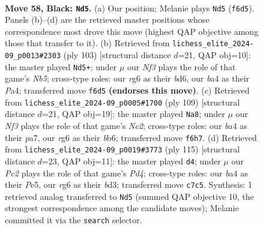 \documentclass[11pt]{article}
\begin{document}
\clearpage

\begin{figure}[p]\centering
\begin{subfigure}{0.46\textwidth}\centering
\resizebox{\linewidth}{!}{%
\newchessgame
\chessboard[
  setfen={2k5/p1p5/5nR1/5p2/B4P2/4B3/2K4P/8 b - - 0 58},
  showmover=false,
  pgfstyle=straightmove, color=movearrow, markmove={f6-d5}
]}
\caption{}
\end{subfigure}\hfill
\begin{subfigure}{0.46\textwidth}\centering
\resizebox{\linewidth}{!}{%
\newchessgame
\chessboard[
  setfen={8/6pp/3B1p2/1k6/pn4P1/2K5/5P1P/8 b - - 5 52},
  showmover=false,
  pgfstyle=straightmove, color=movearrow, markmove={b4-d5}
]}
\caption{}
\end{subfigure}
\\[4pt]
\begin{subfigure}{0.46\textwidth}\centering
\resizebox{\linewidth}{!}{%
\newchessgame
\chessboard[
  setfen={8/P1n2k2/1Bpp4/4p3/8/3K4/6p1/8 b - - 0 55},
  showmover=false,
  pgfstyle=straightmove, color=movearrow, markmove={c7-a8}
]}
\caption{}
\end{subfigure}\hfill
\begin{subfigure}{0.46\textwidth}\centering
\resizebox{\linewidth}{!}{%
\newchessgame
\chessboard[
  setfen={8/8/5p2/1nkppP2/7p/3B1K1P/8/8 b - - 3 58},
  showmover=false,
  pgfstyle=straightmove, color=movearrow, markmove={d5-d4}
]}
\caption{}
\end{subfigure}
\caption{\textbf{Move 58, Black: \texttt{Nd5}.} (a) Our position; Melanie plays \texttt{Nd5} (\texttt{f6d5}). Panels (b)--(d) are the retrieved master positions whose correspondence most drove this move (highest QAP objective among those that transfer to it). (b) Retrieved from \texttt{lichess\_elite\_2024-09\_p0013\#2303} (ply 103) [structural distance $d$=21, QAP obj=10]: the master played \texttt{Nd5+}; under $\mu$ our \emph{Nf3} plays the role of that game's \emph{Nb5}; cross-type roles: our \emph{r}g6 as their \emph{b}d6, our \emph{b}a4 as their \emph{P}a4; transferred move \texttt{f6d5} \textbf{(endorses this move)}. (c) Retrieved from \texttt{lichess\_elite\_2024-09\_p0005\#1700} (ply 109) [structural distance $d$=21, QAP obj=19]: the master played \texttt{Na8}; under $\mu$ our \emph{Nf3} plays the role of that game's \emph{Nc2}; cross-type roles: our \emph{b}a4 as their \emph{p}a7, our \emph{r}g6 as their \emph{b}b6; transferred move \texttt{f6h7}. (d) Retrieved from \texttt{lichess\_elite\_2024-09\_p0019\#3773} (ply 115) [structural distance $d$=23, QAP obj=11]: the master played \texttt{d4}; under $\mu$ our \emph{Pc2} plays the role of that game's \emph{Pd4}; cross-type roles: our \emph{b}a4 as their \emph{P}e5, our \emph{r}g6 as their \emph{b}d3; transferred move \texttt{c7c5}. Synthesis: 1 retrieved analog transferred to \texttt{Nd5} (summed QAP objective 10, the strongest correspondence among the candidate moves); Melanie committed it via the \texttt{search} selector.}
\label{fig:thought-m115}
\end{figure}
\end{document}
